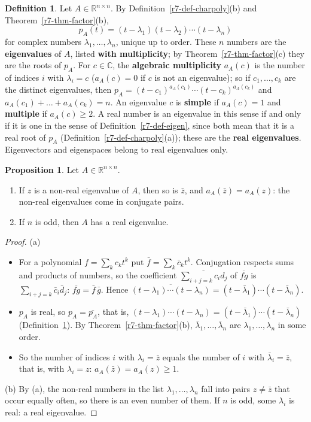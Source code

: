 \documentclass[12pt]{article}
\newcommand{\R}{\mathbb R}
\theoremstyle{definition}
\newtheorem{proposition}[theorem]{Proposition}
\newtheorem{definition}[theorem]{Definition}
\begin{document}
\begin{definition}\label{r7-def-eigenvalues}
Let \(A\in\R^{n\times n}\). By Definition~\ref{r7-def-charpoly}(b) and Theorem~\ref{r7-thm-factor}(b),
\[
p_A(t)=(t-\lambda_1)(t-\lambda_2)\cdots(t-\lambda_n)
\]
for complex numbers \(\lambda_1,\dots,\lambda_n\), unique up to order. These \(n\) numbers are the \textbf{eigenvalues}
of \(A\), listed \textbf{with multiplicity}; by Theorem~\ref{r7-thm-factor}(c) they are the roots of \(p_A\). For
\(c\in\mathbb C\), the \textbf{algebraic multiplicity} \(a_A(c)\) is the number of indices \(i\) with \(\lambda_i=c\)
(\(a_A(c)=0\) if \(c\) is not an eigenvalue); so if \(c_1,\dots,c_k\) are the distinct eigenvalues, then
\(p_A=(t-c_1)^{a_A(c_1)}\cdots(t-c_k)^{a_A(c_k)}\) and \(a_A(c_1)+\dots+a_A(c_k)=n\). An eigenvalue \(c\) is
\textbf{simple} if \(a_A(c)=1\) and \textbf{multiple} if \(a_A(c)\geqslant2\). A real number is an eigenvalue in this
sense if and only if it is one in the sense of Definition~\ref{r7-def-eigen}, since both mean that it is a real root
of \(p_A\) (Definition~\ref{r7-def-charpoly}(a)); these are the \textbf{real eigenvalues}. Eigenvectors and
eigenspaces belong to real eigenvalues only.
\end{definition}

\begin{proposition}\label{r7-prop-conjugate}
Let \(A\in\R^{n\times n}\).
\begin{enumerate}
\item If \(z\) is a non-real eigenvalue of \(A\), then so is \(\bar z\), and \(a_A(\bar z)=a_A(z)\): the non-real
eigenvalues come in conjugate pairs.
\item If \(n\) is odd, then \(A\) has a real eigenvalue.
\end{enumerate}
\end{proposition}
\begin{proof}
(a)
\begin{itemize}
\item For a polynomial \(f=\sum_kc_kt^k\) put \(\bar f=\sum_k\bar c_kt^k\). Conjugation respects sums and products of
numbers, so the coefficient \(\overline{\sum_{i+j=k}c_id_j}\) of \(\overline{fg}\) is \(\sum_{i+j=k}\bar c_i\bar d_j\):
\(\overline{fg}=\bar f\,\bar g\). Hence
\(\overline{(t-\lambda_1)\cdots(t-\lambda_n)}=(t-\bar\lambda_1)\cdots(t-\bar\lambda_n)\).
\item \(p_A\) is real, so \(p_A=\overline{p_A}\), that is,
\((t-\lambda_1)\cdots(t-\lambda_n)=(t-\bar\lambda_1)\cdots(t-\bar\lambda_n)\) (Definition~\ref{r7-def-eigenvalues}). By
Theorem~\ref{r7-thm-factor}(b), \(\bar\lambda_1,\dots,\bar\lambda_n\) are \(\lambda_1,\dots,\lambda_n\) in some order.
\item So the number of indices \(i\) with \(\lambda_i=\bar z\) equals the number of \(i\) with \(\bar\lambda_i=\bar z\),
that is, with \(\lambda_i=z\): \(a_A(\bar z)=a_A(z)\geqslant1\).
\end{itemize}
(b) By (a), the non-real numbers in the list \(\lambda_1,\dots,\lambda_n\) fall into pairs \(z\ne\bar z\) that occur
equally often, so there is an even number of them. If \(n\) is odd, some \(\lambda_i\) is real: a real eigenvalue.
\end{proof}
\end{document}
